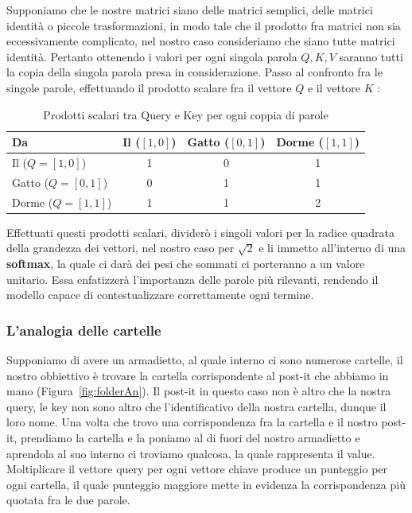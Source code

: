 Supponiamo che le nostre matrici siano delle matrici semplici, delle matrici identità o piccole trasformazioni, in modo tale che il prodotto fra matrici non sia eccessivamente complicato, nel nostro caso consideriamo che siano tutte matrici identità. Pertanto ottenendo i valori per ogni singola parola $Q,K,V$ saranno tutti la copia della singola parola presa in considerazione. Passo al confronto fra le singole parole, effettuando il prodotto scalare fra il vettore $Q$ e il vettore $K$ :

\begin{table}[h!]
    \centering
    \caption{Prodotti scalari tra Query e Key per ogni coppia di parole}
    \begin{tabular}{@{}lccc@{}}
        \toprule
        \textbf{Da} & \textbf{Il ($[1, 0]$)} & \textbf{Gatto ($[0, 1]$)} & \textbf{Dorme ($[1, 1]$)} \\
        \midrule
        Il ($Q = [1, 0]$)     & 1 & 0 & 1 \\
        Gatto ($Q = [0, 1]$)  & 0 & 1 & 1 \\
        Dorme ($Q = [1, 1]$)  & 1 & 1 & 2 \\
        \bottomrule
    \end{tabular}
\end{table}


Effettuati questi prodotti scalari, dividerò i singoli valori per la radice quadrata della grandezza dei vettori, nel nostro caso per $\sqrt{2}$ e li immetto all'interno di una \textbf{softmax}, la quale ci darà dei pesi che sommati ci porteranno a un valore unitario. Essa enfatizzerà l'importanza delle parole più rilevanti, rendendo il modello capace di contestualizzare correttamente ogni termine.

\subsubsection{L'analogia delle cartelle}
Supponiamo di avere un armadietto, al quale interno ci sono numerose cartelle, il nostro obbiettivo è trovare la cartella corrispondente al post-it che abbiamo in mano (Figura~\ref{fig:folderAn}). Il post-it in questo caso non è altro che la nostra query, le key non sono altro che l'identificativo della nostra cartella, dunque il loro nome. Una volta che trovo una corrispondenza fra la cartella e il nostro post-it, prendiamo la cartella e la poniamo al di fuori del nostro armadietto e aprendola al suo interno ci troviamo qualcosa, la quale rappresenta il value. Moltiplicare il vettore query per ogni vettore chiave produce un punteggio per ogni cartella, il quale punteggio maggiore mette in evidenza la corrispondenza più quotata fra le due parole.

